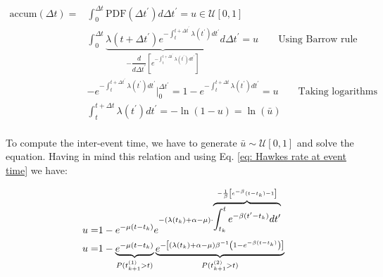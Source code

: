 \begin{equation}
    \begin{split}
        \text{accum}(\Delta t)=&\int_{0}^{\Delta t}\text{PDF}\left( \Delta t^\prime \right)d\Delta t^\prime = u\in\mathcal{U}  [0,1]\\
        &\int_{0}^{\Delta t} \underbrace{\lambda(t+\Delta t^\prime)e^{-\int_{t}^{t+\Delta t^\prime}\lambda(t^{\prime})dt^{\prime}}}_{-\dfrac{d}{d\Delta t^{\prime}}\left[ e^{-\int_{t}^{t+\Delta t^\prime}\lambda (t^\prime) dt^\prime} \right]}d\Delta t^\prime=u \qquad  \text{Using Barrow rule}\\
        &-e^{-\int_{t}^{t+\Delta t^\prime}\lambda(t^\prime)dt^\prime}\Big|_{0}^{\Delta t^\prime}=1-e^{-\int_{t}^{t+\Delta t}\lambda(t^\prime)dt^\prime}=u\qquad  \text{Taking logarithms}\\
        &\int_{t}^{t+\Delta t}\lambda(t^\prime)dt^\prime=-\ln(1-u) = \ln (\bar{u})\\
    \end{split}
    \label{eq: cumulative probability}
\end{equation}

To compute the inter-event time, we have to generate $\bar{u}\sim\mathcal{U}[0,1]$ and solve the equation. Having in mind this relation and using Eq. \ref{eq: Hawkes rate at event time} we have:

\begin{equation}
    \begin{split}
        u=&1-e^{-\mu(t-t_k)}e^{-(\lambda(t_k)+\alpha-\mu)\cdot\overbrace{\int_{t_k}^{t}e^{-\beta(t^\prime-t_k)}dt^\prime}^{-\frac{1}{\beta}\left[ e^{-\beta}(t-t_k)-1 \right]}}\\
        u=&1-\underbrace{e^{-\mu(t-t_k)}}_{P(t_{k+1}^{(1)}>t)}\underbrace{e^{-\left[ (\lambda(t_k)+\alpha-\mu)\beta^{-1}\left( 1-e^{-\beta(t-t_k)} \right) \right]}}_{{P(t_{k+1}^{(2)}>t)}}
    \end{split}
    \label{eq: u = 1 - P(t_{k+1} > t)P(t_{k+1} > t), previo al composition method}
\end{equation}

